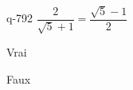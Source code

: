 \begin{truefalse}{q-792}
$\dfrac{2}{\sqrt{5}+1} = \dfrac{\sqrt{5}-1}{2}$
\item* Vrai
\item Faux
\end{truefalse}

